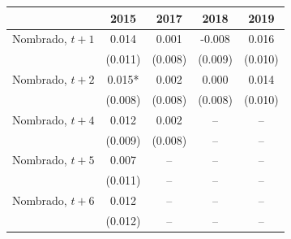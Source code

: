 \begin{tabular}{lcccc}
\toprule
 & 2015 & 2017 & 2018 & 2019 \\
\midrule
Nombrado, $t+1$ & 0.014 & 0.001 & -0.008 & 0.016 \\
 & (0.011) & (0.008) & (0.009) & (0.010) \\
Nombrado, $t+2$ & 0.015* & 0.002 & 0.000 & 0.014 \\
 & (0.008) & (0.008) & (0.008) & (0.010) \\
\midrule
Nombrado, $t+4$ & 0.012 & 0.002 & -- & -- \\
 & (0.009) & (0.008) & -- & -- \\
Nombrado, $t+5$ & 0.007 & -- & -- & -- \\
 & (0.011) & -- & -- & -- \\
Nombrado, $t+6$ & 0.012 & -- & -- & -- \\
 & (0.012) & -- & -- & -- \\
\bottomrule
\end{tabular}
